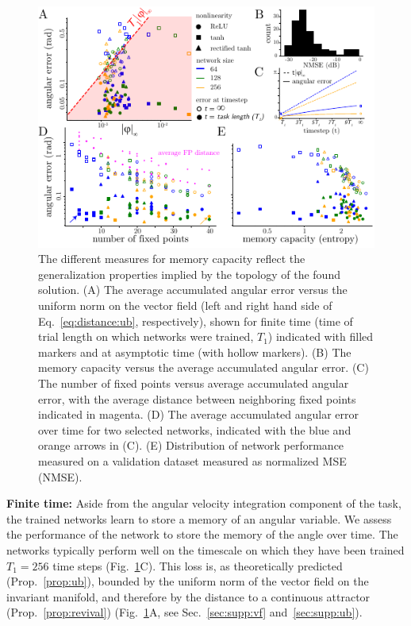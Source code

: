 \documentclass{article} %
\newcommand{\ptitle}[1]{\textbf{#1:}\xspace}
\newcounter{ct}
\theoremstyle{definition}
\theoremstyle{remark}
\begin{document}
\begin{figure}[tbhp]
  \centering
  \includegraphics[width=\textwidth]{angular_losses2}
  \caption{The different measures for memory capacity reflect the generalization properties implied by the topology of the found solution.
  (A) The average accumulated angular error versus the uniform norm on the vector field (left and right hand side of Eq.~\ref{eq:distance:ub}, respectively), shown for finite time (time of trial length on which networks were trained, \(T_{1}\)) indicated with filled markers and at asymptotic time (with hollow markers).
  (B) The memory capacity versus the average accumulated angular error.
  (C) The number of fixed points versus average accumulated angular error, with the average distance between neighboring fixed points indicated in magenta.
  (D) The average accumulated angular error over time for two selected networks, indicated with the blue and orange arrows in (C).
  (E) Distribution of network performance measured on a validation dataset measured as normalized MSE (NMSE).
  }\label{fig:angular_loss}
\end{figure}


\ptitle{Finite time}
Aside from the angular velocity integration component of the task, the trained networks learn to store a memory of an angular variable.
We assess the performance of the network to store the memory of the angle over time.
The networks typically perform well on the timescale on which they have been trained \(T_{1} = 256\) time steps (Fig.~\ref{fig:angular_loss}C).
This loss is, as theoretically predicted (Prop.~\ref{prop:ub}), bounded by the uniform norm of the vector field on the invariant manifold, and therefore by the distance to a continuous attractor (Prop.~\ref{prop:revival}) (Fig.~\ref{fig:angular_loss}A,  see Sec.~\ref{sec:supp:vf} and~\ref{sec:supp:ub}).
\end{document}
